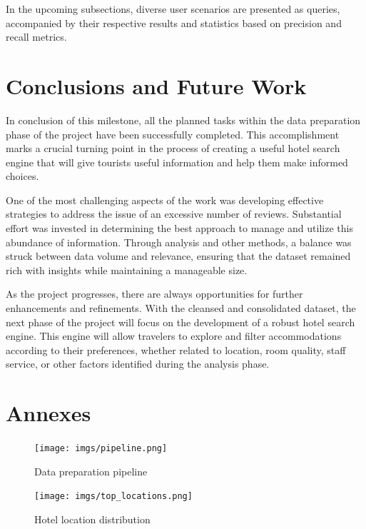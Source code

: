\documentclass[sigconf]{acmart}
\begin{document}
In the upcoming subsections, diverse user scenarios are presented as queries, accompanied by their respective results and statistics based on precision and recall metrics.



\section{Conclusions and Future Work}

In conclusion of this milestone, all the planned tasks within the data preparation phase of the project have been successfully completed. This accomplishment marks a crucial turning point in the process of creating a useful hotel search engine that will give tourists useful information and help them make informed choices.

One of the most challenging aspects of the work was developing effective strategies to address the issue of an excessive number of reviews. Substantial effort was invested in determining the best approach to manage and utilize this abundance of information. Through analysis and other methods, a balance was struck between data volume and relevance, ensuring that the dataset remained rich with insights while maintaining a manageable size.

As the project progresses, there are always opportunities for further enhancements and refinements. With the cleansed and consolidated dataset, the next phase of the project will focus on the development of a robust hotel search engine. This engine will allow travelers to explore and filter accommodations according to their preferences, whether related to location, room quality, staff service, or other factors identified during the analysis phase.

\appendix

\section{Annexes}

\begin{figure}[h]
  \centering
  \texttt{[image: imgs/pipeline.png]}
  \caption{Data preparation pipeline}
  \label{fig:pipeline}
\end{figure}

\begin{figure}[h]
  \centering
  \texttt{[image: imgs/top\_locations.png]}
  \caption{Hotel location distribution}
  \label{fig:hotelLocationDistribution}
\end{figure}
\end{document}
